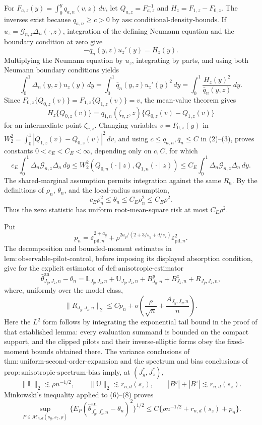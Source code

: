 For \(F_{a,z}(y)=\int_0^yq_{a,n}(v,z)\,dv\), let \(Q_{a,z}=F_{a,z}^{-1}\) and \(H_z=F_{1,z}-F_{0,z}\). The inverses exist because \(q_{a,n}\ge c>0\) by \(\mathrm{ass{:}conditional\text{-}density\text{-}bounds}\). If \(u_z=\mathcal G_{n,z}\Delta_n(\cdot,z)\), integration of the defining Neumann equation and the boundary condition at zero give
\[
-\bar q_n(y,z)u_z'(y)=H_z(y).                                      \tag{1}
\]
Multiplying the Neumann equation by \(u_z\), integrating by parts, and using both Neumann boundary conditions yields
\[
\int_0^1\Delta_n(y,z)u_z(y)\,dy
=\int_0^1\bar q_n(y,z)u_z'(y)^2\,dy
=\int_0^1\frac{H_z(y)^2}{\bar q_n(y,z)}\,dy.                       \tag{2}
\]
Since \(F_{0,z}\{Q_{0,z}(v)\}=F_{1,z}\{Q_{1,z}(v)\}=v\), the mean-value theorem gives
\[
H_z\{Q_{0,z}(v)\}
=q_{1,n}(\zeta_{v,z},z)\{Q_{0,z}(v)-Q_{1,z}(v)\}                 \tag{3}
\]
for an intermediate point \(\zeta_{v,z}\). Changing variables \(v=F_{0,z}(y)\) in \(W_2^2=\int_0^1|Q_{1,z}(v)-Q_{0,z}(v)|^2\,dv\), and using \(c\le q_{a,n},\bar q_n\le C\) in (2)--(3), proves constants \(0<c_E<C_E<\infty\), depending only on \(c,C\), for which
\[
c_E\int_0^1\Delta_n\mathcal G_{n,z}\Delta_n\,dy
\le W_2^2(Q_{0,n}(\cdot\mid z),Q_{1,n}(\cdot\mid z))
\le C_E\int_0^1\Delta_n\mathcal G_{n,z}\Delta_n\,dy.            \tag{4}
\]
The shared-marginal assumption permits integration against the same \(R_n\). By the definitions of \(\rho_n\), \(\theta_n\), and the local-radius assumption,
\[
c_E\rho_n^2\le\theta_n\le C_E\rho_n^2\le C_E\rho^2.             \tag{5}
\]
Thus the zero statistic has uniform root-mean-square risk at most \(C_E\rho^2\).

Put
\[
p_n=\varepsilon_{\mathrm{pil},n}^{2+a_y}
+\rho^{2a_y/(2+3/s_y+d/s_z)}\varepsilon_{\mathrm{pil},n}^2.
\]
The decomposition and bounded-moment estimates in \(\mathrm{lem{:}observable\text{-}pilot\text{-}control}\), before imposing its displayed absorption condition, give for the explicit estimator of \(\mathrm{def{:}anisotropic\text{-}estimator}\)
\[
\widehat\theta^{\mathrm{an}}_{J_y,J_z,n}-\theta_n
=\mathbb L_{J_y,J_z,n}+\mathbb U_{J_y,J_z,n}
+B^y_{J_y,n}+B^z_{J_z,n}+R_{J_y,J_z,n},                            \tag{6}
\]
where, uniformly over the model class,
\[
\|R_{J_y,J_z,n}\|_2\le C p_n+o\!\left(\frac{\rho}{\sqrt n}+\frac{A_{J_y,J_z,n}}n\right). \tag{7}
\]
Here the \(L^2\) form follows by integrating the exponential tail bound in the proof of that established lemma: every evaluation summand is bounded on the compact support, and the clipped pilots and their inverse-elliptic forms obey the fixed-moment bounds obtained there. The variance conclusions of \(\mathrm{thm{:}uniform\text{-}second\text{-}order\text{-}expansion}\) and the spectrum and bias conclusions of \(\mathrm{prop{:}anisotropic\text{-}spectrum\text{-}bias}\) imply, at \((J_y^*,J_z^*)\),
\[
\|\mathbb L\|_2\lesssim\rho n^{-1/2},\qquad
\|\mathbb U\|_2\lesssim r_{n,d}(s_z),\qquad
|B^y|+|B^z|\lesssim r_{n,d}(s_z).                                  \tag{8}
\]
Minkowski's inequality applied to (6)--(8) proves
\[
\sup_{P\in\mathcal M_{n,d}(s_y,s_z,\rho)}
\{E_P(\widehat\theta^{\mathrm{an}}_{J_y^*,J_z^*,n}-\theta_n)^2\}^{1/2}
\le C\{\rho n^{-1/2}+r_{n,d}(s_z)+p_n\}.                         \tag{9}
\]

